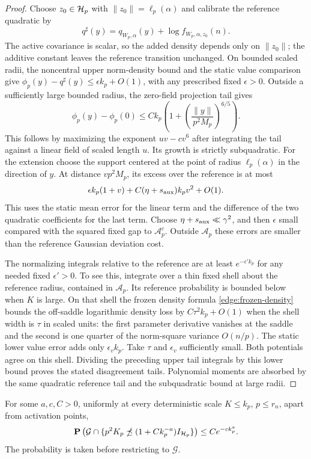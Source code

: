 \begin{proof}
Choose \(z_0\in\mathcal H_p\) with \(\|z_0\|=\ell_p(\alpha)\) and calibrate the
reference quadratic by
\[
 q^\sharp(y)=q_{W_p,\alpha}(y)+\log f_{W_p,\alpha,z_0}(n).
\]
The active covariance is scalar, so the added density depends only on
\(\|z_0\|\); the additive constant leaves the reference transition
unchanged.  On bounded scaled radii, the noncentral upper norm-density
bound and the static value comparison give
\(\phi_p(y)-q^\sharp(y)\le\epsilon k_p+O(1)\), with any prescribed fixed
\(\epsilon>0\).
Outside a sufficiently large bounded radius, the zero-field projection
tail gives
\[
 \phi_p(y)-\phi_p(0)
 \le Ck_p\left(1+
       \left(\frac{\|y\|}{p^2M_p}\right)^{6/5}\right).
\]
This follows by maximizing the exponent \(uv-cv^6\) after integrating
the tail against a linear field of scaled length \(u\).  Its growth is
strictly subquadratic.  For the extension choose the support centered
at the point of radius \(\ell_p(\alpha)\) in the direction of \(y\).
At distance \(vp^2M_p\), its excess over the reference is at most
\[
 \epsilon k_p(1+v)+C(\eta+s_{\rm aux})k_pv^2+O(1).
\]
This uses the static mean error for the linear term and the difference
of the two quadratic coefficients for the last term.  Choose
\(\eta+s_{\rm aux}\ll\gamma^2\), and then \(\epsilon\) small compared with
the squared fixed gap to \(\mathcal A_p^c\).  Outside \(\mathcal A_p\) these errors
are smaller than the reference Gaussian deviation cost.

The normalizing integrals relative to the reference are at least
\(e^{-\epsilon'k_p}\) for any needed fixed \(\epsilon'>0\).
To see this, integrate over a thin fixed shell about the reference radius,
contained in \(\mathcal A_p\).  Its reference probability is bounded below
when \(K\) is large.  On that shell the frozen density formula
\eqref{edge:frozen-density} bounds the off-saddle logarithmic density
loss by \(C\tau^2k_p+O(1)\) when the shell width is \(\tau\) in scaled
units: the first parameter derivative vanishes at the saddle and the
second is one quarter of the norm-square variance \(O(n/p)\).
The static lower value error adds only \(\epsilon_vk_p\).
Take \(\tau\) and \(\epsilon_v\) sufficiently small.  Both potentials
agree on this shell.  Dividing the preceding upper tail integrals by
this lower bound proves the stated disagreement tails.  Polynomial
moments are absorbed by the same quadratic reference tail and the
subquadratic bound at large radii.
\end{proof}

\begin{lemma}\label{edge:positive-curvature}
For some \(a,c,C>0\), uniformly at every deterministic scale
\(K\le k_p\), \(p\le r_n\), apart from activation points,
\begin{equation}\label{edge:positive-curvature-bound}
 \mathbf P\left(
 \mathcal G\cap
 \{p^2K_p\npreceq(1+Ck_p^{-a})I_{\mathcal H_p}\}\right)
       \le C e^{-c k_p^a}.
\end{equation}
The probability is taken before restricting to \(\mathcal G\).
\end{lemma}

